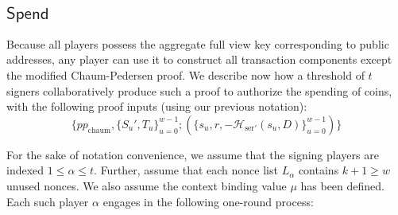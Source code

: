 \documentclass{llncs}
\newcommand{\hash}{\mathcal{H}}
\newcommand{\func}[1]{\mathsf{#1}}
\begin{document}
\subsection{\texorpdfstring{$\func{Spend}$}{Spend}}

Because all players possess the aggregate full view key corresponding to public addresses, any player can use it to construct all transaction components except the modified Chaum-Pedersen proof.
We describe now how a threshold of $t$ signers collaboratively produce such a proof to authorize the spending of coins, with the following proof inputs (using our previous notation):
$$\{pp_{\text{chaum}}, \{S_u', T_u\}_{u=0}^{w-1}; (\{s_u, r, -\hash_{\text{ser}'}(s_u, D)\}_{u=0}^{w-1})\}$$

For the sake of notation convenience, we assume that the signing players are indexed $1 \leq \alpha \leq t$.
Further, assume that each nonce list $L_\alpha$ contains $k + 1 \geq w$ unused nonces.
We also assume the context binding value $\mu$ has been defined.
Each such player $\alpha$ engages in the following one-round process:
\end{document}
